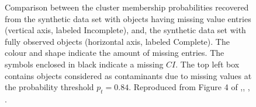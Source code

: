 \begin{figure}[!htp]
\begin{center}
\caption{Comparison between the cluster membership probabilities recovered from the synthetic data set with objects having missing value entries (vertical axis, labeled Incomplete), and, the synthetic data set with fully observed objects (horizontal axis, labeled Complete). The colour and shape indicate the amount of missing entries. The symbols enclosed in black indicate a missing $CI$. The top left box contains objects considered as contaminants due to missing values at the probability threshold $p_t=0.84$. Reproduced from Figure 4 of \citet{Olivares2017},\textit{}, , .}
\label{figure:IncVsCom}
\end{center}
\end{figure}

